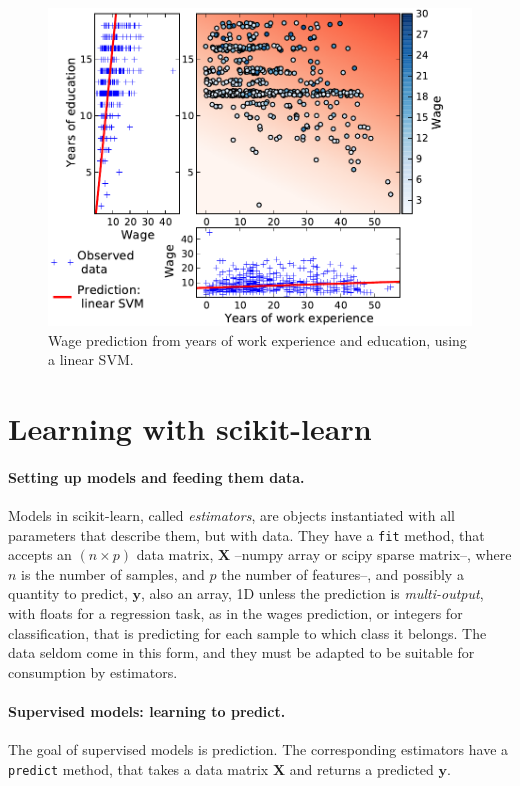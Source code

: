 \documentclass[a4paper]{article}
\begin{document}
\begin{figure}[b]
    \hspace*{-.015\linewidth}%
    \includegraphics[width=1.05\linewidth]{wage_data_linear_svm}%

    \caption{Wage prediction from years of work experience and education,
    using a linear SVM.\label{fig:linear_svm}}
\end{figure}

\section{Learning with scikit-learn}

\paragraph{Setting up models and feeding them data.}
%
Models in scikit-learn, called \emph{estimators}, are objects
instantiated with all parameters that describe them, but with data. They
have a {\tt fit} method, that accepts an $(n \times p)$ data matrix,
$\mathbf{X}$ --numpy array or scipy sparse matrix--, where $n$ is the
number of samples, and $p$ the number of features--, and possibly a
quantity to predict, $\mathbf{y}$, also an array, 1D unless the
prediction is \emph{multi-output}, with floats for a regression task, as
in the wages prediction, or integers for classification, that is
predicting for each sample to which class it belongs. The data seldom
come in this form, and they must be adapted to be suitable for
consumption by estimators.

\paragraph{Supervised models: learning to predict.}
%
The goal of supervised models is prediction. The corresponding estimators
have a {\tt predict} method, that takes a data matrix $\mathbf{X}$ and
returns a predicted $\mathbf{y}$.
\end{document}
